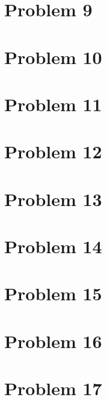 \documentclass[11pt,english]{article}
\begin{document}
\newpage

\section*{Problem 9}

\newpage

\section*{Problem 10}

\newpage

\section*{Problem 11}

\newpage

\section*{Problem 12}

\newpage

\section*{Problem 13}

\newpage

\section*{Problem 14}

\newpage

\section*{Problem 15}

\newpage

\section*{Problem 16}

\newpage

\section*{Problem 17}

\newpage
\end{document}
